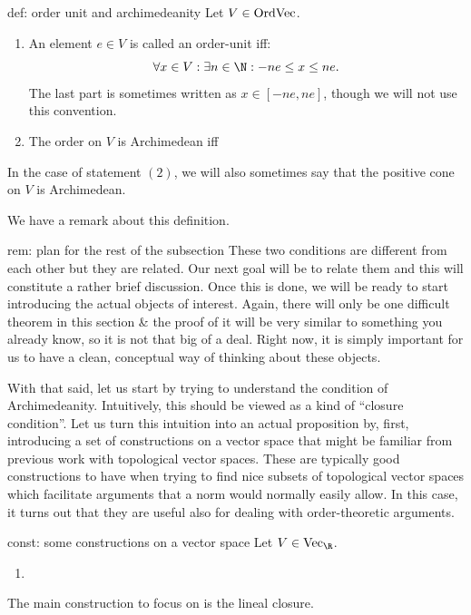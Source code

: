 \documentclass[main.tex]{subfiles}
\begin{document}
\begin{definition}{}{def: order unit and archimedeanity}
Let $V \in \text{OrdVec}$. 
\begin{enumerate}
    \item An element $e \in V$ is called an order-unit iff:
    \[\forall x \in V: \exists n \in \N: -ne \leq x \leq ne.\]
    The last part is sometimes written as $x \in [-ne,ne]$, though we will not use this convention. 
    \item The order on $V$ is Archimedean iff 
\end{enumerate}
In the case of statement $(2)$, we will also sometimes say that the positive cone on $V$ is Archimedean. 
\end{definition}

We have a remark about this definition. 

\begin{remark}{}{rem: plan for the rest of the subsection}
These two conditions are different from each other but they are related. Our next goal will be to relate them and this will constitute a rather brief discussion. Once this is done, we will be ready to start introducing the actual objects of interest. Again, there will only be one difficult theorem in this section \& the proof of it will be very similar to something you already know, so it is not that big of a deal. Right now, it is simply important for us to have a clean, conceptual way of thinking about these objects. 
\end{remark}

With that said, let us start by trying to understand the condition of Archimedeanity. Intuitively, this should be viewed as a kind of ``closure condition''. Let us turn this intuition into an actual proposition by, first, introducing a set of constructions on a vector space that might be familiar from previous work with topological vector spaces. These are typically good constructions to have when trying to find nice subsets of topological vector spaces which facilitate arguments that a norm would normally easily allow. In this case, it turns out that they are useful also for dealing with order-theoretic arguments. 

\begin{construction}{}{const: some constructions on a vector space}
Let $V \in \Vect{\R}$. 
\begin{enumerate}
    \item 
\end{enumerate}
The main construction to focus on is the lineal closure. 
\end{construction}
\end{document}
